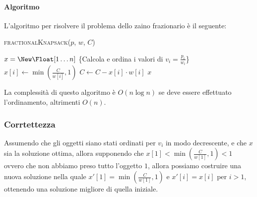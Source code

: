         \paragraph{Algoritmo} L'algoritmo per risolvere il problema dello zaino frazionario è il seguente:
        \begin{algorithm}[H]
            \caption{\Float \textsc{fractionalKnapsack}(\Int[] $p$, \Int[] $w$, \Int $C$)}
            \begin{algorithmic}
                \State \Float[] $x = \New \Float[1 \ldots n]$
                \State \{Calcola e ordina i valori di $v_i = \frac{p_i}{w_i}$\}
                    \State $x[i] \gets \min(\frac{C}{w[i]}, 1)$
                    \State $C \gets C - x[i] \cdot w[i]$
                \EndFor
                \State \Return $x$
            \end{algorithmic}
        \end{algorithm}
        La complessità di questo algoritmo è $O(n\log n)$ se deve essere effettuato l'ordinamento, altrimenti $O(n)$.
        \subsubsection{Corrtettezza}
            Assumendo che gli oggetti siano stati ordinati per $v_i$ in modo decrescente, e che $x$ sia la soluzione ottima, allora supponendo che $x[1] < \min(\frac{C}{w[1]}, 1) < 1$ ovvero che non abbiamo preso tutto l'oggetto $1$, allora possiamo costruire una nuova soluzione nella quale $x'[1]=\min(\frac{C}{w[1]}, 1)$ e $x'[i]=x[i]$ per $i>1$, ottenendo una soluzione migliore di quella iniziale.
            